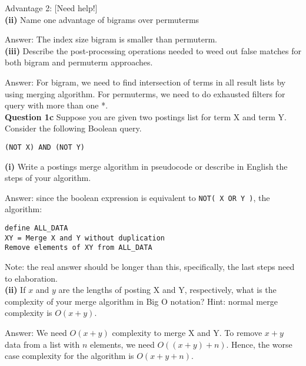 \documentclass[11pt,a4paper]{report}
\begin{document}
\begin{multicols*}{2}
\noindent Advantage 2: [Need help!]\\

\noindent \textbf{(ii)} Name one advantage of bigrams over permuterms

\noindent Answer: The index size bigram is smaller than permuterm.\\

\noindent \textbf{(iii)} Describe the post-processing operations needed to weed out false matches for both bigram and permuterm approaches. 

\noindent Answer: For bigram, we need to find intersection of terms in all result lists by using merging algorithm. For permuterms, we need to do exhausted filters for query with more than one *.\\

\noindent \textbf{Question 1c} Suppose you are given two postings list for term X and term Y. Consider the following Boolean query.

\begin{center}
\verb|(NOT X) AND (NOT Y)|
\end{center}

\noindent \textbf{(i)} Write a postings merge algorithm in pseudocode or describe in English the steps of your algorithm.

\noindent Answer: since the boolean expression is equivalent to \verb|NOT( X OR Y )|, the algorithm:

\begin{verbatim}
define ALL_DATA
XY = Merge X and Y without duplication
Remove elements of XY from ALL_DATA
\end{verbatim}

\noindent Note: the real answer should be longer than this, specifically, the last steps need to elaboration. \\

\noindent \textbf{(ii)} If $x$ and $y$ are the lengths of posting X and Y, respectively, what is the complexity of your merge algorithm in Big O notation? Hint: normal merge complexity is $O(x+y)$.

\noindent Answer: We need $O(x+y)$ complexity to merge X and Y. To remove $x+y$ data from a list with $n$ elements, we need $O((x+y)+n)$. Hence, the worse case complexity for the algorithm is $O(x+y+n)$.



\end{multicols*}
\end{document}
